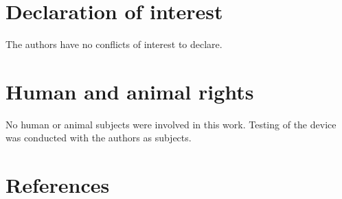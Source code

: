 \documentclass[11pt, letterpaper]{article}
\begin{document}
\section{Declaration of interest}
The authors have no conflicts of interest to declare.


\section{Human and animal rights}
No human or animal subjects were involved in this work. Testing of the device was conducted with the authors as subjects.

\section*{References}
\end{document}
